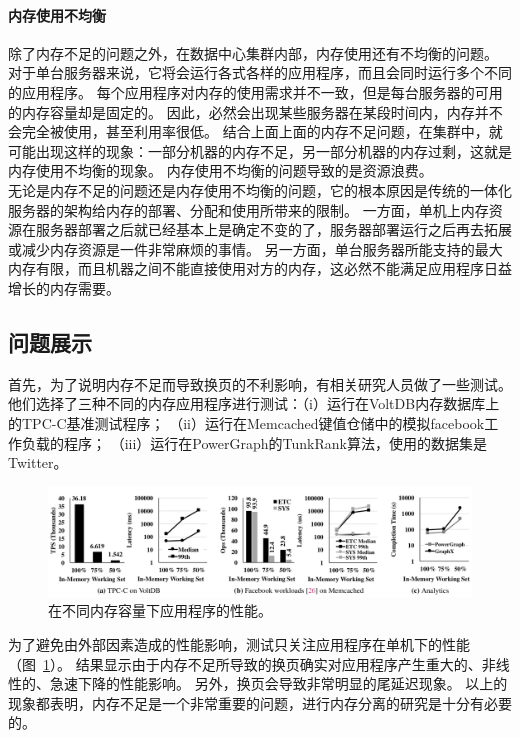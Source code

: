 \paragraph{内存使用不均衡} 
除了内存不足的问题之外，在数据中心集群内部，内存使用还有不均衡的问题。
对于单台服务器来说，它将会运行各式各样的应用程序，而且会同时运行多个不同的应用程序。
每个应用程序对内存的使用需求并不一致，但是每台服务器的可用的内存容量却是固定的。
因此，必然会出现某些服务器在某段时间内，内存并不会完全被使用，甚至利用率很低。
结合上面上面的内存不足问题，在集群中，就可能出现这样的现象：一部分机器的内存不足，另一部分机器的内存过剩，这就是内存使用不均衡的现象。
内存使用不均衡的问题导致的是资源浪费。\\

无论是内存不足的问题还是内存使用不均衡的问题，它的根本原因是传统的一体化服务器的架构给内存的部署、分配和使用所带来的限制。
一方面，单机上内存资源在服务器部署之后就已经基本上是确定不变的了，服务器部署运行之后再去拓展或减少内存资源是一件非常麻烦的事情。
另一方面，单台服务器所能支持的最大内存有限，而且机器之间不能直接使用对方的内存，这必然不能满足应用程序日益增长的内存需要。

\subsection{问题展示}
首先，为了说明内存不足而导致换页的不利影响，有相关研究人员做了一些测试\cite{gu2017efficient}。
他们选择了三种不同的内存应用程序进行测试：（i）运行在VoltDB内存数据库上的TPC-C基准测试程序；
（ii）运行在Memcached键值仓储中的模拟facebook工作负载的程序；
（iii）运行在PowerGraph的TunkRank算法，使用的数据集是Twitter。

\begin{figure}
\centering
\includegraphics[scale=0.45]{Figures/memory/memory_motivation1.png}
\decoRule
\caption{在不同内存容量下应用程序的性能\cite{gu2017efficient}。}
\label{fig:memory_motivation1}
\end{figure}

为了避免由外部因素造成的性能影响，测试只关注应用程序在单机下的性能（图~\ref{fig:memory_motivation1}）。
结果显示由于内存不足所导致的换页确实对应用程序产生重大的、非线性的、急速下降的性能影响。
另外，换页会导致非常明显的尾延迟现象。
以上的现象都表明，内存不足是一个非常重要的问题，进行内存分离的研究是十分有必要的。

